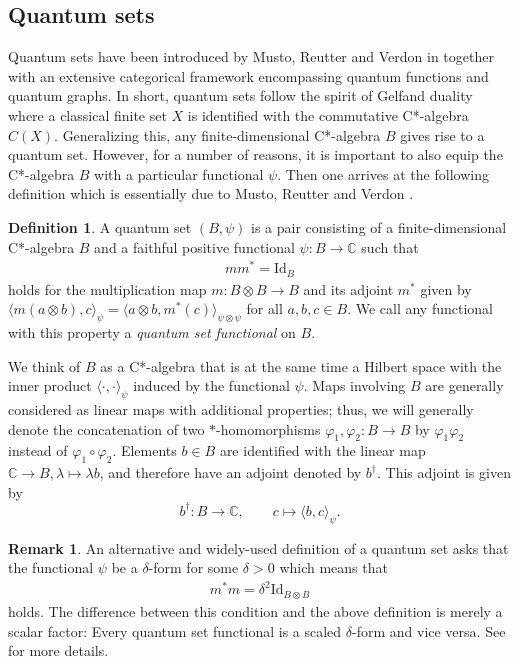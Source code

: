 \documentclass{amsart}
\newcommand{\C}{\mathbb{C}}
\theoremstyle{definition}
\newtheorem{remark}[thm]{Remark}
\newtheorem{definition}[thm]{Definition}
\theoremstyle{definition}
\begin{document}
\subsection{Quantum sets}

Quantum sets have been introduced by Musto, Reutter and Verdon in \cite{musto_compositional_2018} together with an extensive categorical framework encompassing quantum functions and quantum graphs. In short, quantum sets follow the spirit of Gelfand duality where a classical finite set $X$ is identified with the commutative C*-algebra $C(X)$. Generalizing this, any finite-dimensional C*-algebra $B$ gives rise to a quantum set. However, for a number of reasons, it is important to also equip the C*-algebra $B$ with a particular functional $\psi$. Then one arrives at the following definition which is essentially due to Musto, Reutter and Verdon \cite{musto_compositional_2018}.

\begin{definition}
    A quantum set $(B, \psi)$ is a pair consisting of a finite-dimensional C*-algebra $B$ and a faithful positive functional $\psi: B \to \C$ such that
    \begin{align*}
        m m^\ast = \mathrm{Id}_B
    \end{align*}
    holds for the multiplication map $m: B \otimes B \to B$ and its adjoint $m^\ast$ given by $\langle m(a \otimes b), c \rangle_\psi = \langle a \otimes b, m^\ast(c) \rangle_{\psi \otimes \psi}$ for all $a, b, c \in B$.
    We call any functional with this property a \emph{quantum set functional} on $B$.
\end{definition}

We think of $B$ as a C*-algebra that is at the same time a Hilbert space with the inner product $\langle \cdot, \cdot \rangle_{\psi}$ induced by the functional $\psi$. Maps involving $B$ are generally considered as linear maps with additional properties; thus, we will generally denote the concatenation of two $\ast$-homomorphisms $\varphi_1, \varphi_2: B \to B$ by $\varphi_1 \varphi_2$ instead of $\varphi_1 \circ \varphi_2$. Elements $b \in B$ are identified with the linear map $\C \to B, \lambda \mapsto \lambda b$, and therefore have an adjoint denoted by $b^\dagger$. This adjoint is given by 
$$
    b^\dagger: B \to \C,\qquad c \mapsto \langle b, c \rangle_\psi.
$$

\begin{remark}
    An alternative and widely-used definition of a quantum set asks that the functional $\psi$ be a $\delta$-form for some $\delta > 0$ which means that
    \begin{align*}
        m^\ast m = \delta^2 \mathrm{Id}_{B \otimes B}
    \end{align*}
    holds. The difference between this condition and the above definition is merely a scalar factor: Every quantum set functional is a scaled $\delta$-form and vice versa. See \cite{wasilewski_quantum_2024} for more details.
\end{remark}
\end{document}
